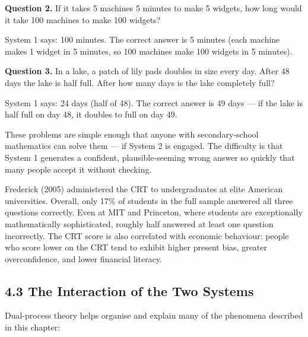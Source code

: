 \documentclass[12pt, letterpaper]{article}
\begin{document}
\textbf{Question 2.} If it takes 5 machines 5 minutes to make 5 widgets, how long would it take 100 machines to make 100 widgets?

System 1 says: 100 minutes. The correct answer is 5 minutes (each machine makes 1 widget in 5 minutes, so 100 machines make 100 widgets in 5 minutes).

\textbf{Question 3.} In a lake, a patch of lily pads doubles in size every day. After 48 days the lake is half full. After how many days is the lake completely full?

System 1 says: 24 days (half of 48). The correct answer is 49 days --- if the lake is half full on day 48, it doubles to full on day 49.

These problems are simple enough that anyone with secondary-school mathematics can solve them --- if System 2 is engaged. The difficulty is that System 1 generates a confident, plausible-seeming wrong answer so quickly that many people accept it without checking.

Frederick (2005) administered the CRT to undergraduates at elite American universities. Overall, only 17\% of students in the full sample answered all three questions correctly. Even at MIT and Princeton, where students are exceptionally mathematically sophisticated, roughly half answered at least one question incorrectly. The CRT score is also correlated with economic behaviour: people who score lower on the CRT tend to exhibit higher present bias, greater overconfidence, and lower financial literacy.

\medskip


\subsection{4.3 The Interaction of the Two Systems}


Dual-process theory helps organise and explain many of the phenomena described in this chapter:
\end{document}
